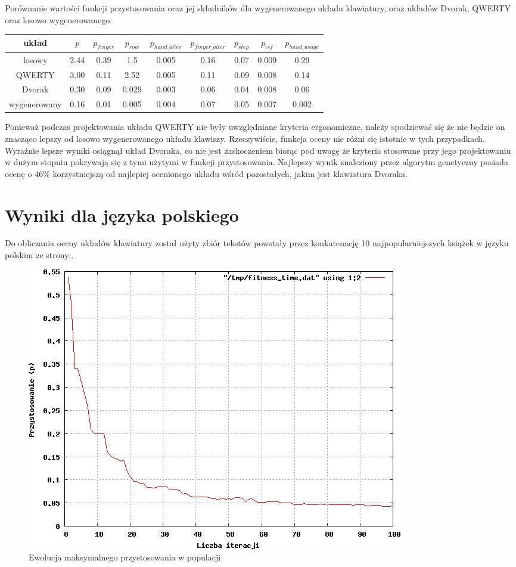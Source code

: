 \documentclass[brudnopis]{xmgr}
\begin{document}
Porównanie wartości funkcji przystosowania oraz jej składników dla wygenerowanego układu klawiatury, oraz układów Dvorak, QWERTY oraz losowo wygenerowanego:\newline
\begin{tabular}{ c | c | c | c | c | c | c | c | c }
  układ & $p$ & $p_{finger}$ & $p_{row}$ & $p_{hand\_alter}$ & $p_{finger\_alter}$ & $p_{step}$ & $p_{isf}$ & $p_{hand\_usage}$ \\
  \hline
  losowy       & 2.44 & 0.39 & 1.5 & 0.005 & 0.16 & 0.07 & 0.009 & 0.29 \\
  QWERTY       & 3.00 & 0.11 & 2.52 & 0.005 & 0.11 & 0.09 & 0.008 & 0.14 \\
  Dvorak       & 0.30 & 0.09 & 0.029 & 0.003 & 0.06 & 0.04 & 0.008 & 0.06 \\
  wygenerowany & 0.16 & 0.01 & 0.005 & 0.004 & 0.07 & 0.05 & 0.007 & 0.002 \\
\end{tabular}\newline

Ponieważ podczas projektowania układu QWERTY nie były uwzględniane kryteria ergonomiczne, należy spodziewać się że nie będzie on znacząco lepszy od losowo wygenerowanego układu klawiszy. Rzeczywiście, funkcja oceny nie różni się istotnie w tych przypadkach. Wyraźnie lepsze wyniki osiągnął układ Dvoraka, co nie jest zaskoczeniem biorąc pod uwagę że kryteria stosowane przy jego projektowaniu w dużym stopniu pokrywają się z tymi użytymi w funkcji przystosowania. Najlepszy wynik znaleziony przez algorytm genetyczny posiada ocenę o $46\%$ korzystniejszą od najlepiej ocenionego układu wśród pozostałych, jakim jest klawiatura Dvoraka.


\section{Wyniki dla języka polskiego}

Do obliczania oceny układów klawiatury został użyty zbiór tekstów powstały przez konkatenację 10 najpopularniejszych książek w języku polskim ze strony:.

\begin{figure}[!tbh]
\centering
\includegraphics[width=.8\hsize]{fig/fitness_time_pl}
\caption{Ewolucja maksymalnego przystosowania w populacji}
\end{figure}
\end{document}
